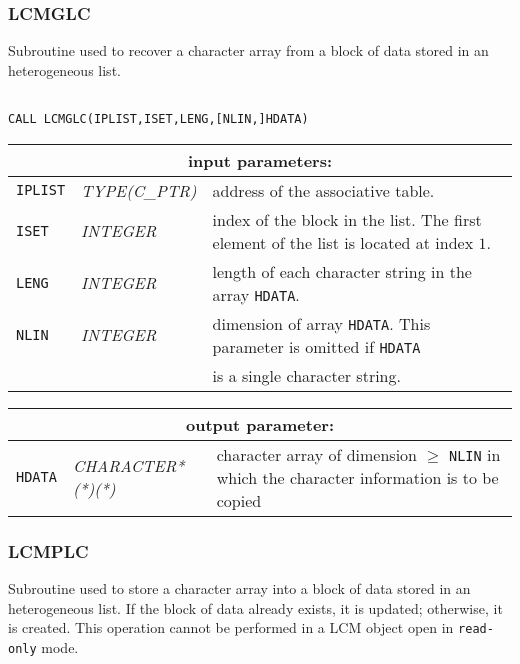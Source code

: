 \subsubsection{LCMGLC}\label{sect:LCMGLC}

Subroutine used to recover a character array from a block of data stored in an heterogeneous list.

\begin{verbatim}

CALL LCMGLC(IPLIST,ISET,LENG,[NLIN,]HDATA)
\end{verbatim}

\noindent
\begin{tabular}{|p{1.5cm}|p{3cm}|p{10cm}|}
\hline
\multicolumn{3}{|c|}{\bf input parameters:} \\
\hline
{\tt IPLIST} & {\it TYPE(C\_PTR)} & address of the associative table. \\
\hline
{\tt ISET} & {\it INTEGER} & index of the block in the list.
The first element of the list is located at index $1$. \\
\hline
{\tt LENG} & {\it INTEGER} & length of each character string in the array {\tt HDATA}. \\
\hline
{\tt NLIN} & {\it INTEGER} & dimension of array {\tt HDATA}. This parameter is omitted if {\tt HDATA} \\
& & is a single character string. \\
\hline
\end{tabular}

\vskip 0.8cm

\noindent
\begin{tabular}{|p{1.5cm}|p{3.5cm}|p{9.5cm}|}
\hline
\multicolumn{3}{|c|}{\bf output parameter:} \\
\hline
{\tt HDATA} & {\it CHARACTER*(*)(*)} & character array of dimension $\ge$ {\tt NLIN} in which the character information is to be copied \\
\hline
\end{tabular}

\subsubsection{LCMPLC}\label{sect:LCMPLC}

Subroutine used to store a character array into a block of data stored in an heterogeneous list.
If the block of data already exists, it is updated; otherwise, it is created. This operation cannot be performed
in a LCM object open in {\tt read-only} mode.


